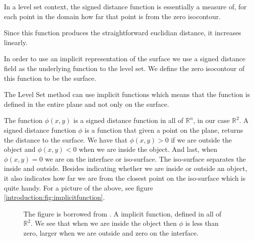 In a level set context, the signed distance function is essentially a
measure of, for each point in the domain how far that point is from
the zero isocontour.

Since this function produces the straightforward euclidian distance,
it increases linearly. 

In order to use an implicit representation of the surface we use a
signed distance field as the underlying function to the level set. We
define the zero isocontour of this function to be the surface.

The Level Set method can use implicit functions which means that the
function is defined in the entire plane and not only on the surface.

The function $\phi(x,y)$ is a signed distance function in all of
$\mathbb{R}^{n}$, in our case $\mathbb{R}^{2}$. A signed distance
function $\phi$ is a function that given a point on the plane, returns
the distance to the surface. We have that $\phi(x,y) > 0$ if we are
outside the object and $\phi(x,y) < 0$ when we are inside the object.
And last, when $\phi(x,y) = 0$ we are on the interface or iso-surface.
The iso-surface separates the inside and outside.  Besides indicating
whether we are inside or outside an object, it also indicates how far
we are from the closest point on the iso-surface which is quite
handy. For a picture of the above, see figure
\vref{introduction:fig:implicitfunction}.


\begin{figure*}[!htb]
  \centering
  \caption{The figure is borrowed from . A
    implicit function, defined in all of $\mathbb{R}^{2}$. We see that
    when we are inside the object then $\phi$ is less than zero,
    larger when we are outside and zero on the interface.}
  \label{introduction:fig:implicitfunction}
\end{figure*}


